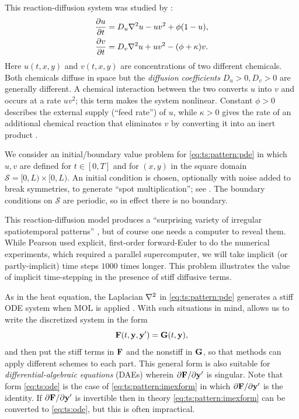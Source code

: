 This reaction-diffusion system was studied by \citep{Pearson1993}:
\begin{align}
\frac{\partial u}{\partial t} &= D_u \nabla^2 u - u v^2 + \phi (1 - u), \label{eq:ts:pattern:pde} \\
\frac{\partial v}{\partial t} &= D_v \nabla^2 u + u v^2 - (\phi + \kappa) v. \notag
\end{align}
Here $u(t,x,y)$ and $v(t,x,y)$ are concentrations of two different chemicals.  Both chemicals diffuse in space but the \emph{diffusion coefficients} $D_u>0,D_v>0$ are generally different.  A chemical interaction between the two converts $u$ into $v$ and occurs at a rate $u v^2$; this term makes the system nonlinear.  Constant $\phi>0$ describes the external supply (``feed rate'') of $u$, while $\kappa>0$ gives the rate of an additional chemical reaction that eliminates $v$ by converting it into an inert product \citep{Pearson1993}.

We consider an initial/boundary value problem for \eqref{eq:ts:pattern:pde} \citep{HundsdorferVerwer2003} in which $u,v$ are defined for $t\in[0,T]$ and for $(x,y)$ in the square domain $\mathcal{S} = [0,L)\times [0,L)$.  An initial condition is chosen, optionally with noise added to break symmetries, to generate ``spot multiplication''; see \citep{Pearson1993}.  The boundary conditions on $\mathcal{S}$ are periodic, so in effect there is no boundary.

This reaction-diffusion model produces a ``surprising variety of irregular spatiotemporal patterns'' \citep{Pearson1993}, but of course one needs a computer to reveal them.  While Pearson used explicit, first-order forward-Euler to do the numerical experiments, which required a parallel supercomputer, we will take implicit (or partly-implicit) time steps $1000$ times longer.  This problem illustrates the value of implicit time-stepping in the presence of stiff diffusive terms.

As in the heat equation, the Laplacian $\nabla^2$ in \eqref{eq:ts:pattern:pde} generates a stiff ODE system when MOL is applied \citep{HundsdorferVerwer2003}.  With such situations in mind, \PETSc allows us to write the discretized system in the form
\begin{equation}
\mathbf{F}(t,\mathbf{y},\mathbf{y}') = \mathbf{G}(t,\mathbf{y}), \label{eq:ts:pattern:imexform}
\end{equation}
and then put the stiff terms in $\mathbf{F}$ and the nonstiff in $\mathbf{G}$, so that methods can apply different schemes to each part.  This general form is also suitable for \emph{differential-algebraic equations} (DAEs) wherein $\partial \mathbf{F}/\partial \mathbf{y}'$ is singular.  Note that form \eqref{eq:ts:ode} is the case of \eqref{eq:ts:pattern:imexform} in which $\partial \mathbf{F}/\partial \mathbf{y}'$ is the identity.  If $\partial \mathbf{F}/\partial \mathbf{y}'$ is invertible then in theory \eqref{eq:ts:pattern:imexform} can be converted to \eqref{eq:ts:ode}, but this is often impractical.

